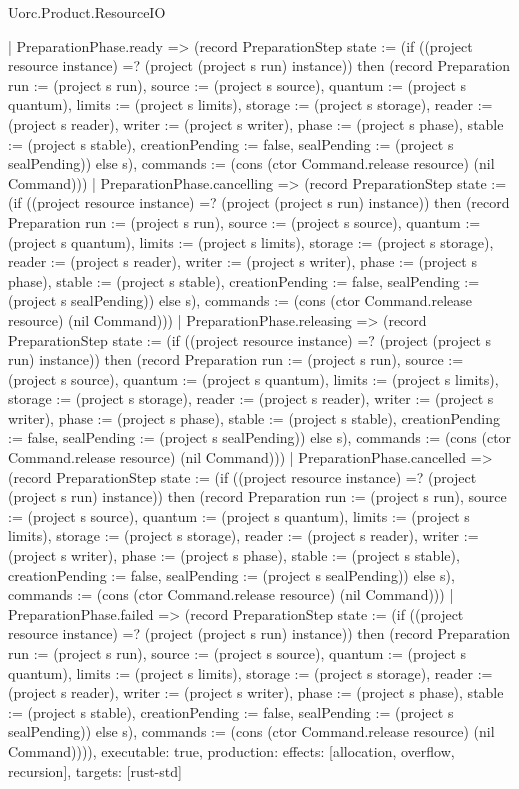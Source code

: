 \begin{lexlean}{Uorc.Product.ResourceIO}
\begin{semanticmodule}
{    | PreparationPhase.ready => (record PreparationStep {state := (if ((project resource instance) =? (project (project s run) instance)) then (record Preparation {run := (project s run), source := (project s source), quantum := (project s quantum), limits := (project s limits), storage := (project s storage), reader := (project s reader), writer := (project s writer), phase := (project s phase), stable := (project s stable), creationPending := false, sealPending := (project s sealPending)}) else s), commands := (cons (ctor Command.release resource) (nil Command))})
    | PreparationPhase.cancelling => (record PreparationStep {state := (if ((project resource instance) =? (project (project s run) instance)) then (record Preparation {run := (project s run), source := (project s source), quantum := (project s quantum), limits := (project s limits), storage := (project s storage), reader := (project s reader), writer := (project s writer), phase := (project s phase), stable := (project s stable), creationPending := false, sealPending := (project s sealPending)}) else s), commands := (cons (ctor Command.release resource) (nil Command))})
    | PreparationPhase.releasing => (record PreparationStep {state := (if ((project resource instance) =? (project (project s run) instance)) then (record Preparation {run := (project s run), source := (project s source), quantum := (project s quantum), limits := (project s limits), storage := (project s storage), reader := (project s reader), writer := (project s writer), phase := (project s phase), stable := (project s stable), creationPending := false, sealPending := (project s sealPending)}) else s), commands := (cons (ctor Command.release resource) (nil Command))})
    | PreparationPhase.cancelled => (record PreparationStep {state := (if ((project resource instance) =? (project (project s run) instance)) then (record Preparation {run := (project s run), source := (project s source), quantum := (project s quantum), limits := (project s limits), storage := (project s storage), reader := (project s reader), writer := (project s writer), phase := (project s phase), stable := (project s stable), creationPending := false, sealPending := (project s sealPending)}) else s), commands := (cons (ctor Command.release resource) (nil Command))})
    | PreparationPhase.failed => (record PreparationStep {state := (if ((project resource instance) =? (project (project s run) instance)) then (record Preparation {run := (project s run), source := (project s source), quantum := (project s quantum), limits := (project s limits), storage := (project s storage), reader := (project s reader), writer := (project s writer), phase := (project s phase), stable := (project s stable), creationPending := false, sealPending := (project s sealPending)}) else s), commands := (cons (ctor Command.release resource) (nil Command))})),
  executable: true,
  production: {effects: [allocation, overflow, recursion], targets: [rust-std]}
}


\end{semanticmodule}
\end{lexlean}

